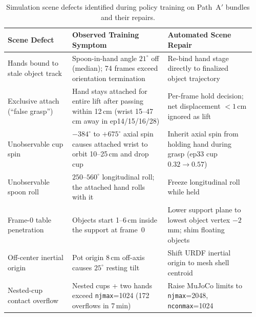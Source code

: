 \documentclass[10pt]{nvidiaextabstract}
\begin{document}
\begin{table}[h]
  \centering\footnotesize
  \setlength{\tabcolsep}{4pt}
  \begin{tabular}{@{}p{0.25\linewidth}p{0.37\linewidth}p{0.34\linewidth}@{}}
    \toprule
    \textbf{Scene Defect} & \textbf{Observed Training Symptom} & \textbf{Automated Scene Repair} \\
    \midrule
    Hands bound to stale object track & Spoon-in-hand angle $21^\circ$ off (median); 74 frames exceed orientation termination & Re-bind hand stage directly to finalized object trajectory \\
    Exclusive attach (``false grasp'') & Hand stays attached for entire lift after passing within 12\,cm (wrist 15--47\,cm away in ep14/15/16/28) & Per-frame hold decision; net displacement $<1$\,cm ignored as lift \\
    Unobservable cup spin & $-384^\circ$ to $+675^\circ$ axial spin causes attached wrist to orbit 10--25\,cm and drop cup & Inherit axial spin from holding hand during grasp (ep33 cup $0.32 \rightarrow 0.57$) \\
    Unobservable spoon roll & $250$--$560^\circ$ longitudinal roll; the attached hand rolls with it & Freeze longitudinal roll while held \\
    Frame-0 table penetration & Objects start 1--6\,cm inside the support at frame~0 & Lower support plane to lowest object vertex $-2$\,mm; shim floating objects \\
    Off-center inertial origin & Pot origin 8\,cm off-axis causes $25^\circ$ resting tilt & Shift URDF inertial origin to mesh shell centroid \\
    Nested-cup contact overflow & Nested cups + two hands exceed \texttt{njmax}=1024 (172 overflows in 7\,min) & Raise MuJoCo limits to \texttt{njmax}=2048, \texttt{nconmax}=1024 \\
    \bottomrule
  \end{tabular}
  \caption{Simulation scene defects identified during policy training on Path~A$'$ bundles and their repairs.}
  \label{tab:hygiene}
\end{table}
\end{document}
